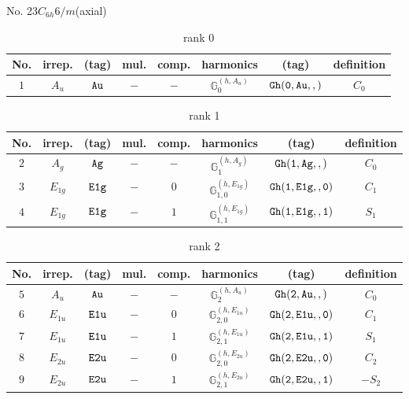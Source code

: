 \documentclass[fleqn,8pt]{jsarticle}
\begin{document}
\setcounter{MaxMatrixCols}{16}

\begin{center}
\LARGE
No. 23\quad$C_{6h}$\quad$6/m$\quad[ hexagonal ] (axial)
\end{center}
\begin{table}[ht!]
\begin{center}
\caption{rank 0}
\renewcommand{\arraystretch}{1.3}
\begin{tabular}{cccccccc} \hline \hline
No. & irrep. & (tag) & mul. & comp. & harmonics & (tag) & definition \\ \hline
$ 1 $ & $ A_{u} $ & $ {\tt Au} $ & $ - $ & $ - $ & $ \mathbb{G}_{0}^{(h,A_{u})} $ & $ {\tt Gh(0,Au,,)} $ & $ C_{0} $ \\
 \hline \hline
\end{tabular}
\end{center}
\end{table}
\begin{table}[ht!]
\begin{center}
\caption{rank 1}
\renewcommand{\arraystretch}{1.3}
\begin{tabular}{cccccccc} \hline \hline
No. & irrep. & (tag) & mul. & comp. & harmonics & (tag) & definition \\ \hline
$ 2 $ & $ A_{g} $ & $ {\tt Ag} $ & $ - $ & $ - $ & $ \mathbb{G}_{1}^{(h,A_{g})} $ & $ {\tt Gh(1,Ag,,)} $ & $ C_{0} $ \\
$ 3 $ & $ E_{1g} $ & $ {\tt E1g} $ & $ - $ & $ 0 $ & $ \mathbb{G}_{1,0}^{(h,E_{1g})} $ & $ {\tt Gh(1,E1g,,0)} $ & $ C_{1} $ \\
$ 4 $ & $ E_{1g} $ & $ {\tt E1g} $ & $ - $ & $ 1 $ & $ \mathbb{G}_{1,1}^{(h,E_{1g})} $ & $ {\tt Gh(1,E1g,,1)} $ & $ S_{1} $ \\
 \hline \hline
\end{tabular}
\end{center}
\end{table}
\begin{table}[ht!]
\begin{center}
\caption{rank 2}
\renewcommand{\arraystretch}{1.3}
\begin{tabular}{cccccccc} \hline \hline
No. & irrep. & (tag) & mul. & comp. & harmonics & (tag) & definition \\ \hline
$ 5 $ & $ A_{u} $ & $ {\tt Au} $ & $ - $ & $ - $ & $ \mathbb{G}_{2}^{(h,A_{u})} $ & $ {\tt Gh(2,Au,,)} $ & $ C_{0} $ \\
$ 6 $ & $ E_{1u} $ & $ {\tt E1u} $ & $ - $ & $ 0 $ & $ \mathbb{G}_{2,0}^{(h,E_{1u})} $ & $ {\tt Gh(2,E1u,,0)} $ & $ C_{1} $ \\
$ 7 $ & $ E_{1u} $ & $ {\tt E1u} $ & $ - $ & $ 1 $ & $ \mathbb{G}_{2,1}^{(h,E_{1u})} $ & $ {\tt Gh(2,E1u,,1)} $ & $ S_{1} $ \\
$ 8 $ & $ E_{2u} $ & $ {\tt E2u} $ & $ - $ & $ 0 $ & $ \mathbb{G}_{2,0}^{(h,E_{2u})} $ & $ {\tt Gh(2,E2u,,0)} $ & $ C_{2} $ \\
$ 9 $ & $ E_{2u} $ & $ {\tt E2u} $ & $ - $ & $ 1 $ & $ \mathbb{G}_{2,1}^{(h,E_{2u})} $ & $ {\tt Gh(2,E2u,,1)} $ & $ - S_{2} $ \\
 \hline \hline
\end{tabular}
\end{center}
\end{table}
\end{document}
